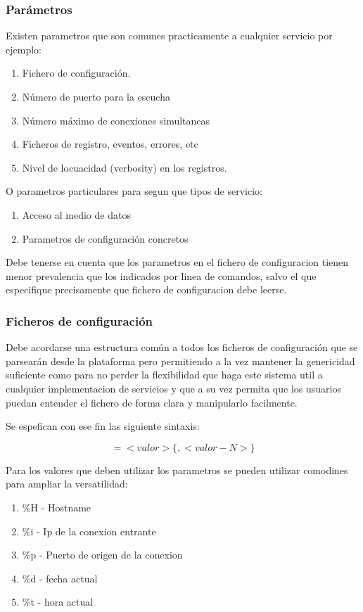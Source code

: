 \documentclass[a4paper,spanish,12pt]{book}
\begin{document}
\subsubsection{Parámetros}
Existen parametros que son comunes practicamente a cualquier servicio por ejemplo:
\begin{enumerate}
	\item Fichero de configuraci\'on.
	\item N\'umero de puerto para la escucha
	\item N\'umero m\'aximo de conexiones simultaneas
	\item Ficheros de registro, eventos, errores, etc
	\item Nivel de locuacidad (verbosity) en los registros.
\end{enumerate}
O parametros particulares para segun que tipos de servicio:
\begin{enumerate}
	\item Acceso al medio de datos
	\item Parametros de configuraci\'on concretos
\end{enumerate}
Debe tenerse en cuenta que los parametros en el fichero de configuracion tienen menor prevalencia que los indicados por linea de comandos, salvo el que especifique precisamente que fichero de configuracion debe leerse.

\subsubsection{Ficheros de configuración}
Debe acordarse una estructura común a todos los ficheros de configuración que se parsearán desde la plataforma pero permitiendo a la vez mantener la genericidad suficiente como para no perder la flexibilidad que haga este sistema util a cualquier implementacion de servicios y que a su vez permita que los usuarios puedan entender el fichero de forma clara y manipularlo facilmente.

Se espefican con ese fin las siguiente sintaxis:


\[<nombre parametro>=<valor>\{,<valor-N>\}\]


Para los valores que deben utilizar los parametros se pueden utilizar comodines para ampliar la versatilidad:
\begin{enumerate}
	\item \%H - Hostname
	\item \%i - Ip de la conexion entrante
	\item \%p - Puerto de origen de la conexion
	\item \%d - fecha actual
	\item \%t - hora actual
\end{enumerate}
\end{document}

